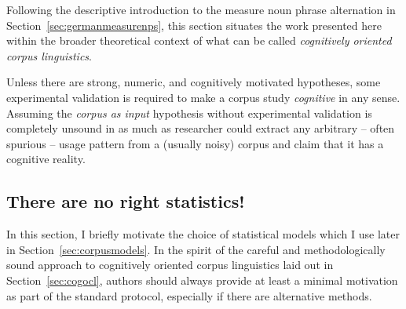 \documentclass[USenglish]{article}
\begin{document}

Following the descriptive introduction to the measure noun phrase alternation in Section~\ref{sec:germanmeasurenps}, this section situates the work presented here within the broader theoretical context of what can be called \textit{cognitively oriented corpus linguistics}.

Unless there are strong, numeric, and cognitively motivated hypotheses, some experimental validation is required to make a corpus study \textit{cognitive} in any sense.
Assuming the \textit{corpus as input} hypothesis without experimental validation is completely unsound in as much as researcher could extract any arbitrary -- often spurious -- usage pattern from a (usually noisy) corpus and claim that it has a cognitive reality.




\subsection{There are no right statistics!}
\label{ssec:rightstatistics}

In this section, I briefly motivate the choice of statistical models which I use later in Section~\ref{sec:corpusmodels}.
In the spirit of the careful and methodologically sound approach to cognitively oriented corpus linguistics laid out in Section~\ref{sec:cogocl}, authors should always provide at least a minimal motivation as part of the standard protocol, especially if there are alternative methods.

\end{document}
